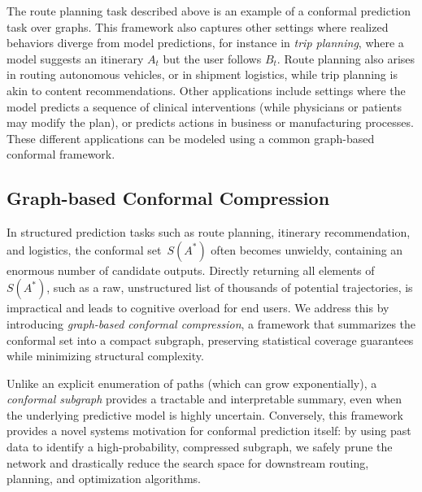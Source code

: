 The route planning task described above is an example of a conformal prediction task over graphs. 
This framework also captures other settings where realized behaviors diverge from model predictions, for instance in \emph{trip planning}, where a model suggests an itinerary $A_t$ but the user follows $B_t$. Route planning also arises in routing autonomous vehicles, or in shipment logistics, while trip planning is akin to content recommendations. Other applications include settings where the model predicts %
a sequence of clinical interventions (while physicians or patients may modify the plan), or predicts actions in business or manufacturing processes. These different applications can be modeled using a common graph-based conformal framework. 



\subsection{Graph-based Conformal Compression} 

In structured prediction tasks such as route planning, itinerary recommendation, and logistics, the conformal set~$S(A^*)$ often becomes unwieldy, containing an enormous number of candidate outputs. Directly returning all elements of~$S(A^*)$, such as a raw, unstructured list of thousands of potential trajectories, is impractical and leads to cognitive overload for end users. We address this by introducing \emph{graph-based conformal compression}, a framework that summarizes the conformal set into a compact subgraph, preserving statistical coverage guarantees while minimizing structural complexity. 

Unlike an explicit enumeration of paths (which can grow exponentially), a \emph{conformal subgraph} provides a tractable and interpretable summary, even when the underlying predictive model is highly uncertain. Conversely, this framework provides a novel systems motivation for conformal prediction itself: by using past data to identify a high-probability, compressed subgraph, we safely prune the network and drastically reduce the search space for downstream routing, planning, and optimization algorithms.

